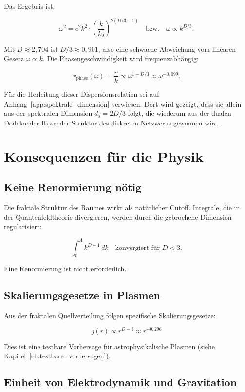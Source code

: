 Das Ergebnis ist:

\[
\omega^2 = c^2 k^2 \cdot \left( \frac{k}{k_0} \right)^{2(D/3 - 1)} \quad \text{bzw.} \quad \omega \propto k^{D/3}.
\]

Mit \( D \approx 2,704 \) ist \( D/3 \approx 0,901 \), also eine schwache Abweichung vom linearen Gesetz \( \omega \propto k \). Die Phasengeschwindigkeit wird frequenzabhängig:

\[
v_{\text{phase}}(\omega) = \frac{\omega}{k} \propto \omega^{1 - D/3} \approx \omega^{-0,099}.
\]

Für die Herleitung dieser Dispersionsrelation sei auf Anhang~\ref{app:spektrale_dimension} verwiesen. Dort wird gezeigt, dass sie allein aus der spektralen Dimension \( d_s = 2D/3 \) folgt, die wiederum aus der dualen Dodekaeder-Ikosaeder-Struktur des diskreten Netzwerks gewonnen wird.

\section{Konsequenzen für die Physik}
\label{sec:fm_konsequenzen}

\subsection{Keine Renormierung nötig}
\label{sub:fm_renormierung}

Die fraktale Struktur des Raumes wirkt als natürlicher Cutoff. Integrale, die in der Quantenfeldtheorie divergieren, werden durch die gebrochene Dimension regularisiert:

\[
\int_0^{\Lambda} k^{D-1} \, dk \quad \text{konvergiert für } D < 3.
\]

Eine Renormierung ist nicht erforderlich.

\subsection{Skalierungsgesetze in Plasmen}
\label{sub:fm_plasmen}

Aus der fraktalen Quellverteilung folgen spezifische Skalierungsgesetze:

\[
j(r) \propto r^{D-3} \approx r^{-0,296}
\]

Dies ist eine testbare Vorhersage für astrophysikalische Plasmen (siehe Kapitel~\ref{ch:testbare_vorhersagen}).

\subsection{Einheit von Elektrodynamik und Gravitation}
\label{sub:fm_einheit}

